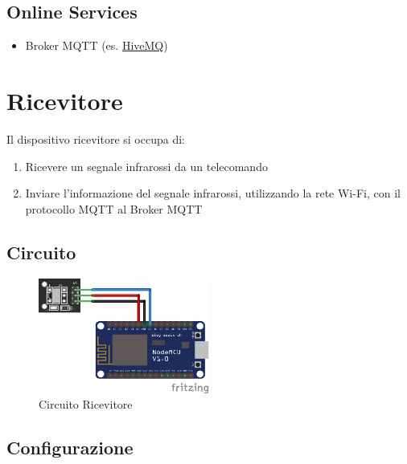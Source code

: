 \documentclass[a4paper,11pt]{article}
\begin{document}
  \subsection{Online Services}

    \begin{itemize}
      \item Broker MQTT (es. \href{https://www.hivemq.com/}{HiveMQ})
    \end{itemize}



\section{Ricevitore}
\label{sec:receiver}

  Il dispositivo ricevitore si occupa di:

  \begin{enumerate}
    \item Ricevere un segnale infrarossi da un telecomando
    \item Inviare l'informazione del segnale infrarossi, utilizzando la rete Wi-Fi, con il protocollo MQTT al Broker MQTT
  \end{enumerate}

  \subsection{Circuito}

    \begin{figure}[H]
      \centering
      \includegraphics[width=0.5\textwidth,height=\textheight,keepaspectratio]{assets/receiver_fritzing}
      \caption{Circuito Ricevitore}
    \end{figure}

  \subsection{Configurazione}
\end{document}
